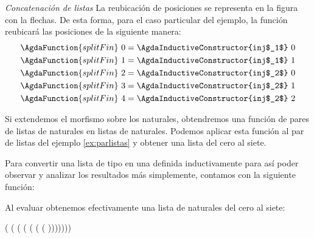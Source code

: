 \begin{example}{\it Concatenación de listas}
La reubicación de posiciones se representa en la figura con la flechas. De esta forma, para el caso particular del ejemplo, la función  reubicará las posiciones de la siguiente manera:  
  \begin{align*}
\AgdaFunction{splitFin}\ 0 &= \AgdaInductiveConstructor{inj$_1$}\ {0}\\
\AgdaFunction{splitFin}\ 1 &= \AgdaInductiveConstructor{inj$_1$}\ {1}\\
\AgdaFunction{splitFin}\ 2 &= \AgdaInductiveConstructor{inj$_2$}\ {0}\\      
\AgdaFunction{splitFin}\ 3 &= \AgdaInductiveConstructor{inj$_2$}\ {1}\\
\AgdaFunction{splitFin}\ 4 &= \AgdaInductiveConstructor{inj$_2$}\ {2}
  \end{align*}
  
  Si extendemos el morfismo  sobre los naturales, obtendremos una función de pares de listas de naturales en listas de naturales. Podemos aplicar esta función al par de listas del ejemplo \ref{ex:parlistas} y obtener una lista del cero al siete.
  

Para convertir una lista de tipo  en una definida inductivamente para así poder observar y analizar los resultados más simplemente, contamos con la siguiente función:


Al evaluar  obtenemos efectivamente una lista de naturales del cero al siete:

 \cons ( \cons ( \cons ( \cons ( \cons ( \cons ( \cons ( \cons \AgdaInductiveConstructor{[]})))))))

\end{example}
